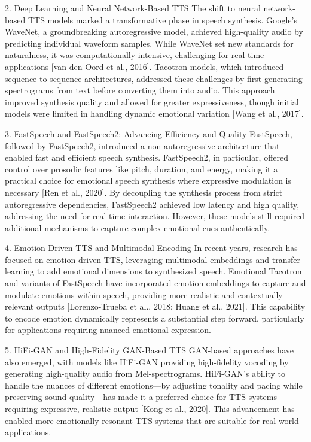 2. Deep Learning and Neural Network-Based TTS
The shift to neural network-based TTS models marked a transformative phase in speech synthesis. Google’s WaveNet, a groundbreaking autoregressive model, achieved high-quality audio by predicting individual waveform samples. While WaveNet set new standards for naturalness, it was computationally intensive, challenging for real-time applications [van den Oord et al., 2016]. Tacotron models, which introduced sequence-to-sequence architectures, addressed these challenges by first generating spectrograms from text before converting them into audio. This approach improved synthesis quality and allowed for greater expressiveness, though initial models were limited in handling dynamic emotional variation [Wang et al., 2017].

3. FastSpeech and FastSpeech2: Advancing Efficiency and Quality
FastSpeech, followed by FastSpeech2, introduced a non-autoregressive architecture that enabled fast and efficient speech synthesis. FastSpeech2, in particular, offered control over prosodic features like pitch, duration, and energy, making it a practical choice for emotional speech synthesis where expressive modulation is necessary [Ren et al., 2020]. By decoupling the synthesis process from strict autoregressive dependencies, FastSpeech2 achieved low latency and high quality, addressing the need for real-time interaction. However, these models still required additional mechanisms to capture complex emotional cues authentically.

4. Emotion-Driven TTS and Multimodal Encoding
In recent years, research has focused on emotion-driven TTS, leveraging multimodal embeddings and transfer learning to add emotional dimensions to synthesized speech. Emotional Tacotron and variants of FastSpeech have incorporated emotion embeddings to capture and modulate emotions within speech, providing more realistic and contextually relevant outputs [Lorenzo-Trueba et al., 2018; Huang et al., 2021]. This capability to encode emotion dynamically represents a substantial step forward, particularly for applications requiring nuanced emotional expression.

5. HiFi-GAN and High-Fidelity GAN-Based TTS
GAN-based approaches have also emerged, with models like HiFi-GAN providing high-fidelity vocoding by generating high-quality audio from Mel-spectrograms. HiFi-GAN’s ability to handle the nuances of different emotions—by adjusting tonality and pacing while preserving sound quality—has made it a preferred choice for TTS systems requiring expressive, realistic output [Kong et al., 2020]. This advancement has enabled more emotionally resonant TTS systems that are suitable for real-world applications.

